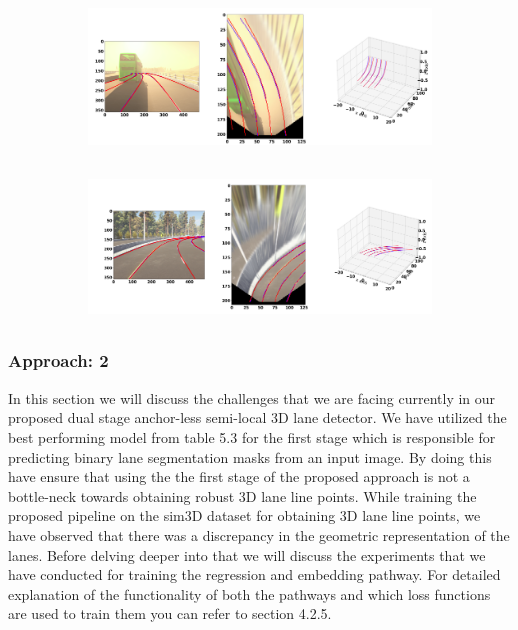 \begin{figure}[h]
      \caption{Qualitative results of the  GenLaneNet\cite{guo2020gen} trained with complex binary lane segmentation architecture on visually varied scenes from sim3D\cite{} dataset: (a) uphill (b) downhill scenario}
        \centering
        \begin{subfigure}{0.6\textwidth}
        \includegraphics[width=1\linewidth, height=4cm]{images/uphill_illus.png} 
        \caption{}
        \label{fig:subim1}
        \end{subfigure}
        \begin{subfigure}{0.6\textwidth}
        \includegraphics[width=1\linewidth,height=4cm]{images/downhill_illus.png}
        \caption{}
        \label{fig:subim2}
        \end{subfigure}
        \end{figure}
        
        
\subsubsection{Approach: 2}
In this section we will discuss the challenges that we are facing currently in our proposed dual stage anchor-less semi-local 3D lane detector. We have utilized the best performing model from table 5.3 for the first stage which is responsible for predicting binary lane segmentation masks from an input image. By doing this have ensure that using the the first stage of the proposed approach is not a bottle-neck towards obtaining robust 3D lane line points. While training the proposed pipeline on the sim3D dataset for obtaining 3D lane line points, we have observed that there was a discrepancy in the geometric representation of the lanes. Before delving deeper into that we will discuss the experiments that we have conducted for training the regression and embedding pathway. For detailed explanation of the functionality of both the pathways and which loss functions are used to train them you can refer to section 4.2.5. 

